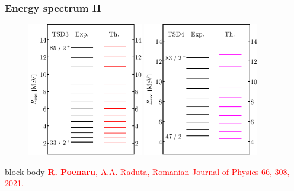 \documentclass{beamer}
\begin{document}
\begin{frame}
	\frametitle{Energy spectrum II}
	\begin{figure}
		\centering
		\includegraphics[width=0.45\textwidth]{figures/parity-partners-plots/tsd3.pdf}
		\includegraphics[width=0.45\textwidth]{figures/parity-partners-plots/tsd4.pdf}
	\end{figure}
	\begin{beamercolorbox}[rounded=true,shadow=false, wd=\linewidth,]{block body}
		\centering
		\textcolor{red}{\footnotesize{\textbf{R. Poenaru}, A.A. Raduta, Romanian Journal of Physics 66, 308, 2021.}}
	\end{beamercolorbox}
\end{frame}
\end{document}
